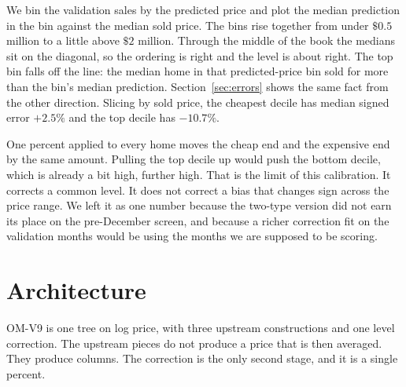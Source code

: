 \documentclass[11pt]{article}
\newcommand{\modelid}{OM-V9}
\begin{document}
We bin the validation sales by the predicted price and plot the median prediction in the bin against the median sold price. The bins rise together from under \(\$0.5\) million to a little above \(\$2\) million. Through the middle of the book the medians sit on the diagonal, so the ordering is right and the level is about right. The top bin falls off the line: the median home in that predicted-price bin sold for more than the bin's median prediction. Section~\ref{sec:errors} shows the same fact from the other direction. Slicing by sold price, the cheapest decile has median signed error \(+2.5\%\) and the top decile has \(-10.7\%\).

One percent applied to every home moves the cheap end and the expensive end by the same amount. Pulling the top decile up would push the bottom decile, which is already a bit high, further high. That is the limit of this calibration. It corrects a common level. It does not correct a bias that changes sign across the price range. We left it as one number because the two-type version did not earn its place on the pre-December screen, and because a richer correction fit on the validation months would be using the months we are supposed to be scoring.

\FloatBarrier
\section{Architecture}
\label{sec:architecture}

\modelid{} is one tree on log price, with three upstream constructions and one level correction. The upstream pieces do not produce a price that is then averaged. They produce columns. The correction is the only second stage, and it is a single percent.
\end{document}
